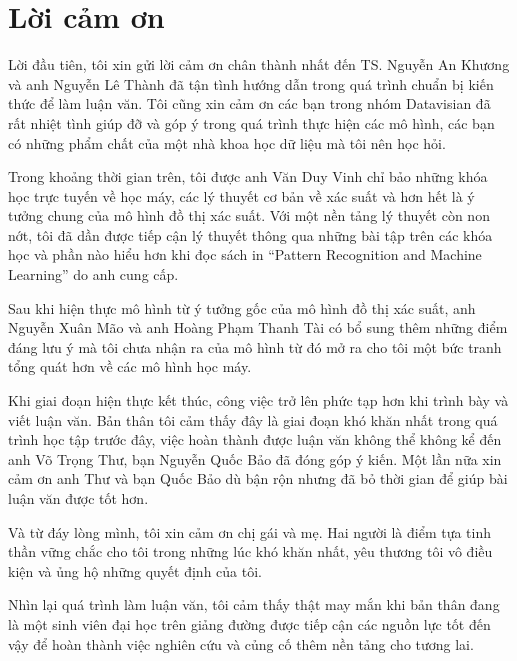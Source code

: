 \chapter*{Lời cảm ơn}
Lời đầu tiên, tôi xin gửi lời cảm ơn chân thành nhất đến TS. Nguyễn An Khương và anh Nguyễn Lê Thành đã tận tình hướng dẫn trong quá trình chuẩn bị kiến thức để làm luận văn.
Tôi cũng xin cảm ơn các bạn trong nhóm Datavisian đã rất nhiệt tình giúp đỡ và góp ý trong quá trình thực hiện các mô hình, các bạn có những phẩm chất của một nhà khoa học dữ liệu mà tôi nên học hỏi.


Trong khoảng thời gian trên, tôi được anh Văn Duy Vinh chỉ bảo những khóa học trực tuyến về học máy, các lý thuyết cơ bản về xác suất và hơn hết là ý tưởng chung của mô hình đồ thị xác suất. Với một nền tảng lý thuyết còn non nớt, tôi đã dần được tiếp cận lý thuyết thông qua những bài tập trên các khóa học và phần nào hiểu hơn khi đọc sách in ``Pattern Recognition and Machine Learning'' do anh cung cấp.

Sau khi hiện thực mô hình từ ý tưởng gốc của mô hình đồ thị xác suất, anh Nguyễn Xuân Mão và anh Hoàng Phạm Thanh Tài có bổ sung thêm những điểm đáng lưu ý mà tôi chưa nhận ra của mô hình từ đó mở ra cho tôi một bức tranh tổng quát hơn về các mô hình học máy.

Khi giai đoạn hiện thực kết thúc, công việc trở lên phức tạp hơn khi trình bày và viết luận văn. Bản thân tôi cảm thấy đây là giai đoạn khó khăn nhất trong quá trình học tập trước đây, việc hoàn thành được luận văn không thể không kể đến anh Võ Trọng Thư, bạn Nguyễn Quốc Bảo đã đóng góp ý kiến. Một lần nữa xin cảm ơn anh Thư và bạn Quốc Bảo dù bận rộn nhưng đã bỏ thời gian để  giúp bài luận văn được tốt hơn.

Và từ đáy lòng mình, tôi xin cảm ơn chị gái và mẹ. Hai người là điểm tựa tinh thần vững chắc cho tôi trong những lúc khó khăn nhất, yêu thương tôi vô điều kiện và ủng hộ những quyết định của tôi.

Nhìn lại quá trình làm luận văn, tôi cảm thấy thật may mắn khi bản thân đang là một sinh viên đại học trên giảng đường được tiếp cận các nguồn lực tốt đến vậy để hoàn thành việc nghiên cứu và củng cố thêm nền tảng cho tương lai.